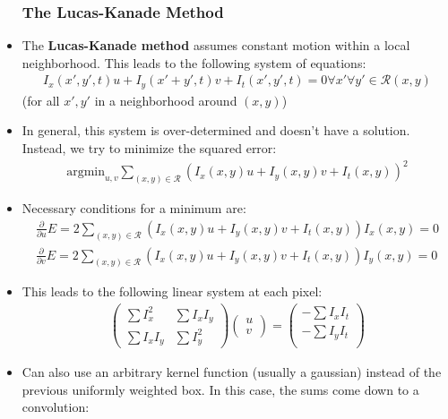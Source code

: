 \documentclass{scrartcl}
\newcommand{\Partial}[1]{\frac{\partial}{\partial #1}}
\begin{document}
\begin{itemize}
    \subsubsection*{The Lucas-Kanade Method}
    \item The \textbf{Lucas-Kanade method} assumes constant motion within a local neighborhood. This leads to the following system of equations:
    \begin{align*}
        I_x(x',y',t)u + I_y(x'+y',t)v+ I_t(x',y',t) = 0 \forall x' \forall y' \in \mathcal{R}(x,y)
    \end{align*}
    (for all $x',y'$ in a neighborhood around $(x,y)$)
    \item In general, this system is over-determined and doesn't have a solution. Instead, we try to minimize the squared error:
    \begin{align*}
        \text{argmin}_{u,v} \sum_{(x,y) \in \mathcal{R}} (I_x(x,y)u + I_y(x,y)v + I_t(x,y))^2
    \end{align*}
    \item Necessary conditions for a minimum are:
    \begin{align*}
        \Partial{u}E = 2\sum_{(x,y) \in \mathcal{R}} (I_x(x,y)u + I_y(x,y)v + I_t(x,y))I_x(x,y) = 0\\
        \Partial{v}E = 2\sum_{(x,y) \in \mathcal{R}} (I_x(x,y)u + I_y(x,y)v + I_t(x,y))I_y(x,y) = 0
    \end{align*}
    \item This leads to the following linear system at each pixel:
    \begin{align*}
        \begin{pmatrix}
            \sum I_x^2 & \sum I_x I_y\\
            \sum I_x I_y & \sum I_y ^2
        \end{pmatrix}
        \begin{pmatrix}
            u \\ v
        \end{pmatrix}
        = 
        \begin{pmatrix}
            -\sum I_x I_t\\
            -\sum I_y I_t\\
        \end{pmatrix}
    \end{align*}
    \item Can also use an arbitrary kernel function (usually a gaussian) instead of the previous uniformly weighted box. In this case, the sums come down to a convolution:

\end{itemize}
\end{document}
